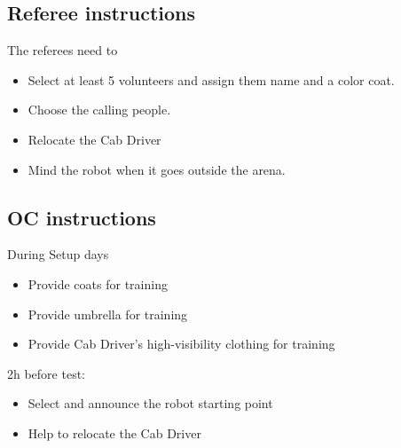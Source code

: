 \subsection{Referee instructions}

The referees need to
\begin{itemize}
	\item Select at least 5 volunteers and assign them name and a color coat.
	\item Choose the calling people.
	\item Relocate the Cab Driver
	\item Mind the robot when it goes outside the arena.
\end{itemize}

\subsection{OC instructions}
During Setup days
\begin{itemize}
	\item Provide coats for training
	\item Provide umbrella for training
	\item Provide Cab Driver's high-visibility clothing for training
\end{itemize}

2h before test:
\begin{itemize}
	\item Select and announce the robot starting point
	\item Help to relocate the Cab Driver
\end{itemize}

% 
